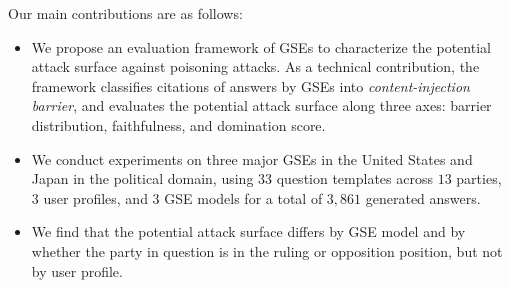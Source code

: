 Our main contributions are as follows:
\begin{itemize}
    \item We propose an evaluation framework of GSEs to characterize the potential attack surface against poisoning attacks.
    As a technical contribution, the framework classifies citations of answers by GSEs into \emph{content-injection barrier}, and evaluates the potential attack surface along three axes: barrier distribution, faithfulness, and domination score.
    \item We conduct experiments on three major GSEs in the United States and Japan in the political domain, using $33$ question templates across $13$ parties, $3$ user profiles, and $3$ GSE models for a total of $3{,}861$ generated answers.
    \item We find that the potential attack surface differs by GSE model and by whether the party in question is in the ruling or opposition position, but not by user profile.
\end{itemize}

